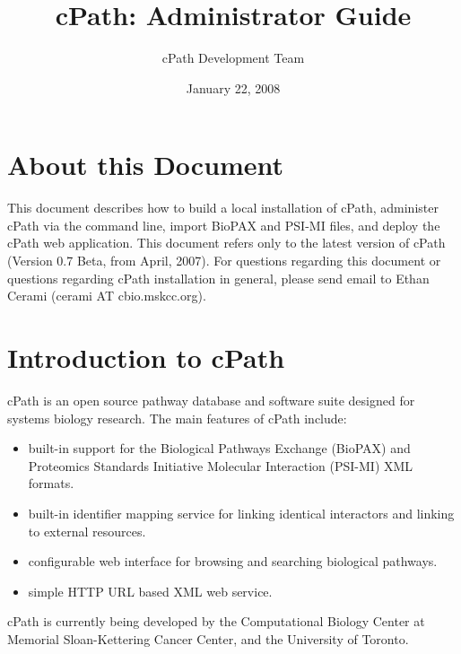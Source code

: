 \documentclass[letterpaper,12pt]{article}
\title{cPath:  Administrator Guide}
\author{cPath Development Team}
\date{January 22, 2008}
\begin{document}
\maketitle

\tableofcontents


\section{About this Document}

This document describes how to build a local installation of cPath, administer cPath via the command line, import BioPAX and PSI-MI files, and deploy the cPath web application.  This document refers only to the latest version of cPath (Version 0.7 Beta, from April, 2007).  For questions regarding this document or questions regarding cPath installation in general, please send email to Ethan Cerami (cerami AT cbio.mskcc.org).

\section{Introduction to cPath}

cPath is an open source pathway database and software suite designed for systems biology research. The main features of cPath include:

\begin{itemize}

  \item built-in support for the Biological Pathways Exchange (BioPAX) and Proteomics Standards Initiative Molecular Interaction (PSI-MI) XML formats.

  \item built-in identifier mapping service for linking identical interactors and linking to external resources.

  \item configurable web interface for browsing and searching biological pathways.

  \item simple HTTP URL based XML web service.

\end{itemize}

cPath is currently being developed by the Computational Biology Center at Memorial Sloan-Kettering Cancer Center, and the University of Toronto.

\bigskip
\end{document}
